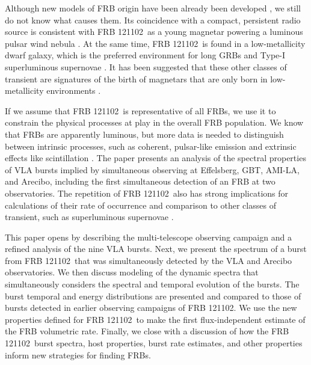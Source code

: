 \documentclass[twocolumn]{aastex61}
\newcommand{\frb}{FRB 121102}
\begin{document}
Although new models of FRB origin have been already been developed \citep{2017arXiv170104815K, 2017arXiv170102370M, 2017arXiv170104094Z, 2017arXiv170102492D}, we still do not know what causes them. Its coincidence with a compact, persistent radio source is consistent with \frb\ as a young magnetar powering a luminous pulsar wind nebula \citep{2017arXiv170104815K}. At the same time, \frb\ is found in a low-metallicity dwarf galaxy, which is the preferred environment for long GRBs and Type-I superluminous supernovae \citep[LGRB and SLSN-I, respectively;][]{2017arXiv170102370M}. It has been suggested that these other classes of transient are signatures of the birth of magnetars that are only born in low-metallicity environments \citep{2014ApJ...787..138L}.


If we assume that \frb\ is representative of all FRBs, we use it to constrain the physical processes at play in the overall FRB population. We know that FRBs are apparently luminous, but more data is needed to distinguish between intrinsic processes, such as coherent, pulsar-like emission \citep{2014PhRvD..89j3009K, 2014ApJ...785L..26L, 2016MNRAS.457..232C} and extrinsic effects like scintillation \citep{CORDES}. The paper presents an analysis of the spectral properties of VLA bursts implied by simultaneous observing at Effelsberg, GBT, AMI-LA, and Arecibo, including the first simultaneous detection of an FRB at two observatories. The repetition of \frb\ also has strong implications for calculations of their rate of occurrence \citep{2016MNRAS.458L..89C} and comparison to other classes of transient, such as superluminous supernovae \citep{OPT}.

This paper opens by describing the multi-telescope observing campaign and a refined analysis of the nine VLA bursts. Next, we present the spectrum of a burst from \frb\ that was simultaneously detected by the VLA and Arecibo observatories. We then discuss modeling of the dynamic spectra that simultaneously considers the spectral and temporal evolution of the bursts. The burst temporal and energy distributions are presented and compared to those of bursts detected in earlier observing campaigns of \frb. We use the new properties defined for \frb\ to make the first flux-independent estimate of the FRB volumetric rate. Finally, we close with a discussion of how the \frb\ burst spectra, host properties, burst rate estimates, and other properties inform new strategies for finding FRBs.
\end{document}

